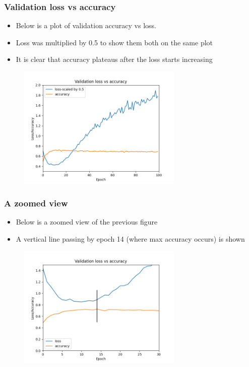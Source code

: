 \documentclass{beamer}
\begin{document}
\begin{frame}
    \frametitle{Validation loss vs accuracy}
\begin{itemize}
    \item Below is a plot of validation accuracy vs loss.
    \item Loss was multiplied by 0.5 to show them both on the same plot
    \item It is clear that accuracy plateaus after the loss starts increasing
\end{itemize}
\begin{center}
    \begin{figure}
     \includegraphics[width=0.7\textwidth]{figs/valid-loss-vs-accuracy1.png}
        
    \end{figure}
\end{center}

\end{frame}\begin{frame}
    \frametitle{A zoomed view}
    \begin{itemize}
        \item Below is a zoomed view of the previous figure
        \item A vertical line passing by epoch 14 (where max accuracy occurs) is shown 
    \end{itemize}
    \begin{figure}
        \includegraphics[width=0.7\textwidth]{figs/valid-loss-vs-accuracy.png}
           
       \end{figure}
    

\end{frame}
\end{document}
